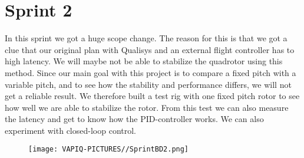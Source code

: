 \section{Sprint 2}

In this sprint we got a huge scope change. The reason for this is that we got a clue that our original plan with Qualisys and an external flight controller has to high latency. We will maybe not be able to stabilize the quadrotor using this method. Since our main goal with this project is to compare a fixed pitch with a variable pitch, and to see how the stability and performance differs, we will not get a reliable result. We therefore built a test rig with one fixed pitch rotor to see how well we are able to stabilize the rotor. From this test we can also measure the latency and get to know how the PID-controller works. We can also experiment with closed-loop control. 

\begin{figure}[h]
        \centering
        \texttt{[image: VAPIQ-PICTURES//SprintBD2.png]}
        \\[2.0 cm] 
    \end{figure}            

